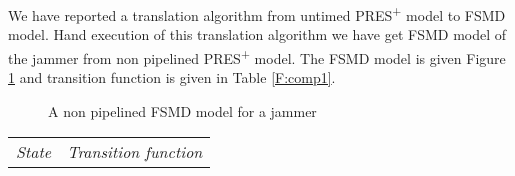 \documentclass[9pt,executive]{article}
\def\presp{PRES\textsuperscript{+}}
\def\fsmd{FSMD}
\def\presp{PRES\textsuperscript{+}}
\def\fsmd{FSMD}
\begin{document}
We have reported a translation algorithm from untimed {\presp} model to {\fsmd} model. Hand execution of
this translation algorithm we have get {\fsmd}  model of the jammer from non pipelined {\presp} model. 
The {\fsmd} model is given Figure \ref{fig:jfsmd} and transition function is given in Table \ref{F:comp1}.
\begin{figure}[htbp]
\centerline{}
\caption{A non pipelined {\fsmd} model for a jammer}
\label{fig:jfsmd}
\end{figure}
\begin{table}[t]
  \begin{center}
    \small\addtolength{\tabcolsep}{-5pt}
\begin{tabular}{|c|c|} \hline 
\emph{State}                           & \emph{Transition function}              \\
               

\end{tabular}
\end{center}
\end{table}
\end{document}
